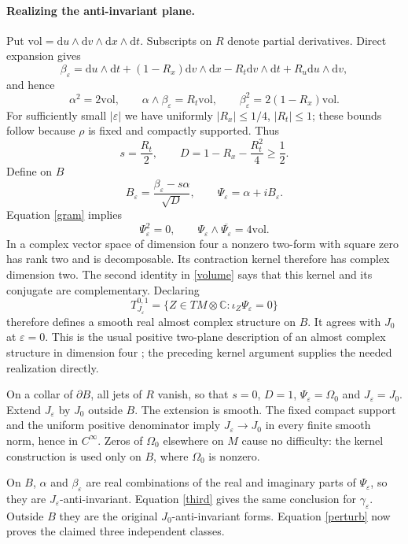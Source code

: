 \documentclass[11pt]{article}
\newcommand{\C}{\mathbb C}
\newcommand{\vol}{\mathrm{vol}}
\newcommand{\dd}{\mathrm d}
\begin{document}
\paragraph{Realizing the anti-invariant plane.}
Put $\vol=\dd u\wedge\dd v\wedge\dd x\wedge\dd t$. Subscripts on $R$
denote partial derivatives. Direct expansion gives
\[
 \beta_\varepsilon
 =\dd u\wedge\dd t+(1-R_x)\dd v\wedge\dd x
     -R_t\dd v\wedge\dd t+R_u\dd u\wedge\dd v,
\]
and hence
\begin{equation}\label{gram}
 \alpha^2=2\vol,\qquad
 \alpha\wedge\beta_\varepsilon=R_t\vol,\qquad
 \beta_\varepsilon^2=2(1-R_x)\vol .
\end{equation}
For sufficiently small $|\varepsilon|$ we have uniformly
$|R_x|\leq1/4$, $|R_t|\leq1$; these bounds follow because $\rho$ is fixed
and compactly supported. Thus
\[
 s=\frac{R_t}{2},\qquad D=1-R_x-\frac{R_t^2}{4}\geq\frac12 .
\]
Define on $B$
\[
 B_\varepsilon=\frac{\beta_\varepsilon-s\alpha}{\sqrt D},\qquad
 \Psi_\varepsilon=\alpha+iB_\varepsilon .
\]
Equation \eqref{gram} implies
\begin{equation}\label{volume}
 \Psi_\varepsilon^2=0,\qquad
 \Psi_\varepsilon\wedge\overline{\Psi_\varepsilon}=4\vol .
\end{equation}
In a complex vector space of dimension four a nonzero two-form with square
zero has rank two and is decomposable. Its contraction kernel therefore
has complex dimension two. The second identity in \eqref{volume} says that
this kernel and its conjugate are complementary. Declaring
\[
 T^{0,1}_{J_\varepsilon}
  =\{Z\in TM\otimes\C:\iota_Z\Psi_\varepsilon=0\}
\]
therefore defines a smooth real almost complex structure on $B$.
It agrees with $J_0$ at $\varepsilon=0$. This is the usual positive
two-plane description of an almost complex structure in dimension four
\cite{Donaldson}; the preceding kernel argument supplies the needed
realization directly.

On a collar of $\partial B$, all jets of $R$ vanish, so that
$s=0$, $D=1$, $\Psi_\varepsilon=\Omega_0$ and $J_\varepsilon=J_0$.
Extend $J_\varepsilon$ by $J_0$ outside $B$. The extension is smooth.
The fixed compact support and the uniform positive denominator imply
$J_\varepsilon\to J_0$ in every finite smooth norm, hence in $C^\infty$.
Zeros of $\Omega_0$ elsewhere on $M$ cause no difficulty: the kernel
construction is used only on $B$, where $\Omega_0$ is nonzero.

On $B$, $\alpha$ and $\beta_\varepsilon$ are real combinations of the real
and imaginary parts of $\Psi_\varepsilon$, so they are $J_\varepsilon$-anti-invariant.
Equation \eqref{third} gives the same conclusion for $\gamma_\varepsilon$.
Outside $B$ they are the original $J_0$-anti-invariant forms.
Equation \eqref{perturb} now proves the claimed three independent classes.
\end{document}
